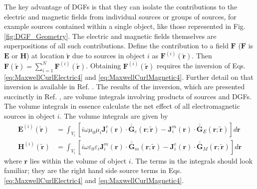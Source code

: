 The key advantage of DGFs is that they can isolate the contributions to the electric and magnetic fields from individual sources or groups of sources, for example sources contained within a single object, like those represented in Fig. \ref{fig:DGF_Geometry}. The electric and magnetic fields themselves are superpositions of all such contributions. Define the contribution to a field $\boldsymbol{F}$ ($\boldsymbol{F}$ is $\boldsymbol{E}$ or $\boldsymbol{H}$) at location $\widetilde{\boldsymbol{r}}$ due to sources in object $i$ as $\boldsymbol{F}^{(i)}(\widetilde{\boldsymbol{r}})$. Then $\boldsymbol{F}(\widetilde{\boldsymbol{r}}) = \sum_{i=1}^{N}\boldsymbol{F}^{(i)}(\widetilde{\boldsymbol{r}})$. Obtaining $\boldsymbol{F}^{(i)}(\widetilde{\boldsymbol{r}})$ requires the inversion of Eqs. \ref{eq:MaxwellCurlElectric4} and \ref{eq:MaxwellCurlMagnetic4}. Further detail on that inversion is available in Ref. . The results of the inversion, which are presented succinctly in Ref. , are volume integrals involving products of sources and DGFs. The volume integrals in essence calculate the net effect of all electromagnetic sources in object $i$. The volume integrals are given by
% 
\begin{subequations}
\begin{align}
\boldsymbol{E}^{(i)}(\widetilde{\boldsymbol{r}}) &= \int_{V_{i}} \left[ i \omega \mu_{0} \mu_{i} \boldsymbol{J}_{i}^{e}(\boldsymbol{r}) \cdot \overline{\overline{\boldsymbol{G}}}_{e}(\boldsymbol{r}; \widetilde{\boldsymbol{r}}) - \boldsymbol{J}_{i}^{m}(\boldsymbol{r}) \cdot \overline{\overline{\boldsymbol{G}}}_{E}(\boldsymbol{r}; \widetilde{\boldsymbol{r}}) \right] d\boldsymbol{r} \label{eq:InvertedE}
\\
\boldsymbol{H}^{(i)}(\widetilde{\boldsymbol{r}}) &= \int_{V_{i}} \left[ i \omega \varepsilon_{0} \varepsilon_{i} \boldsymbol{J}_{i}^{m}(\boldsymbol{r}) \cdot \overline{\overline{\boldsymbol{G}}}_{m}(\boldsymbol{r}; \widetilde{\boldsymbol{r}}) - \boldsymbol{J}_{i}^{e}(\boldsymbol{r}) \cdot \overline{\overline{\boldsymbol{G}}}_{M}(\boldsymbol{r}; \widetilde{\boldsymbol{r}}) \right] d\boldsymbol{r} \label{eq:InvertedH}
\end{align} \label{eq:InvertedFields}
\end{subequations}
%
where $\boldsymbol{r}$ lies within the volume of object $i$. The terms in the integrals should look familiar; they are the right hand side source terms in Eqs. \ref{eq:MaxwellCurlElectric4} and \ref{eq:MaxwellCurlMagnetic4}. 

